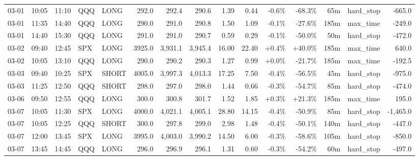 \documentclass[11pt,a4paper,twoside]{article}
\begin{document}
\begin{landscape}
\begin{center}
\begin{longtable}{>{\color{txtmain}}l l l l l r r r r r r r r >{\color{txtmain}}l r}
03-01 & 10:05 & 11:10 & QQQ & LONG & 292.0 & 292.4 & 290.6 & 1.39 & 0.44 & \textcolor{lossred}{-0.6\%} & \textcolor{lossred}{-68.3\%} & 65m & hard\_stop & \textcolor{lossred}{-665.0} \\
03-01 & 11:35 & 14:40 & QQQ & LONG & 290.0 & 291.0 & 290.8 & 1.50 & 1.09 & \textcolor{lossred}{-0.1\%} & \textcolor{lossred}{-27.6\%} & 185m & max\_time & \textcolor{lossred}{-249.0} \\
03-01 & 14:40 & 15:30 & QQQ & LONG & 291.0 & 291.0 & 290.7 & 0.59 & 0.29 & \textcolor{lossred}{-0.1\%} & \textcolor{lossred}{-50.0\%} & 50m & hard\_stop & \textcolor{lossred}{-472.0} \\
03-02 & 09:40 & 12:45 & SPX & LONG & 3925.0 & 3,931.1 & 3,945.4 & 16.00 & 22.40 & \textcolor{wingreen}{+0.4\%} & \textcolor{wingreen}{+40.0\%} & 185m & max\_time & \textcolor{wingreen}{640.0} \\
03-02 & 10:05 & 13:10 & QQQ & LONG & 290.0 & 290.2 & 290.3 & 1.27 & 0.99 & \textcolor{wingreen}{+0.0\%} & \textcolor{lossred}{-21.7\%} & 185m & max\_time & \textcolor{lossred}{-192.5} \\
03-03 & 09:40 & 10:25 & SPX & SHORT & 4005.0 & 3,997.3 & 4,013.3 & 17.25 & 7.50 & \textcolor{lossred}{-0.4\%} & \textcolor{lossred}{-56.5\%} & 45m & hard\_stop & \textcolor{lossred}{-975.0} \\
03-03 & 11:25 & 12:50 & QQQ & SHORT & 298.0 & 297.0 & 298.0 & 1.44 & 0.66 & \textcolor{lossred}{-0.3\%} & \textcolor{lossred}{-54.7\%} & 85m & hard\_stop & \textcolor{lossred}{-474.0} \\
03-06 & 09:50 & 12:55 & QQQ & LONG & 300.0 & 300.8 & 301.7 & 1.52 & 1.85 & \textcolor{wingreen}{+0.3\%} & \textcolor{wingreen}{+21.3\%} & 185m & max\_time & \textcolor{wingreen}{195.0} \\
03-07 & 10:05 & 11:30 & SPX & LONG & 4000.0 & 4,021.1 & 4,005.1 & 28.80 & 14.15 & \textcolor{lossred}{-0.4\%} & \textcolor{lossred}{-50.9\%} & 85m & hard\_stop & \textcolor{lossred}{-1,465.0} \\
03-07 & 10:05 & 12:25 & QQQ & SHORT & 300.0 & 297.8 & 299.0 & 2.98 & 1.48 & \textcolor{lossred}{-0.4\%} & \textcolor{lossred}{-50.1\%} & 140m & hard\_stop & \textcolor{lossred}{-447.0} \\
03-07 & 12:00 & 13:45 & SPX & LONG & 3995.0 & 4,003.0 & 3,990.2 & 14.50 & 6.00 & \textcolor{lossred}{-0.3\%} & \textcolor{lossred}{-58.6\%} & 105m & hard\_stop & \textcolor{lossred}{-850.0} \\
03-07 & 13:45 & 14:45 & QQQ & LONG & 296.0 & 296.9 & 296.1 & 1.31 & 0.60 & \textcolor{lossred}{-0.3\%} & \textcolor{lossred}{-54.2\%} & 60m & hard\_stop & \textcolor{lossred}{-497.0} \\

\end{longtable}
\end{center}
\end{landscape}
\end{document}
